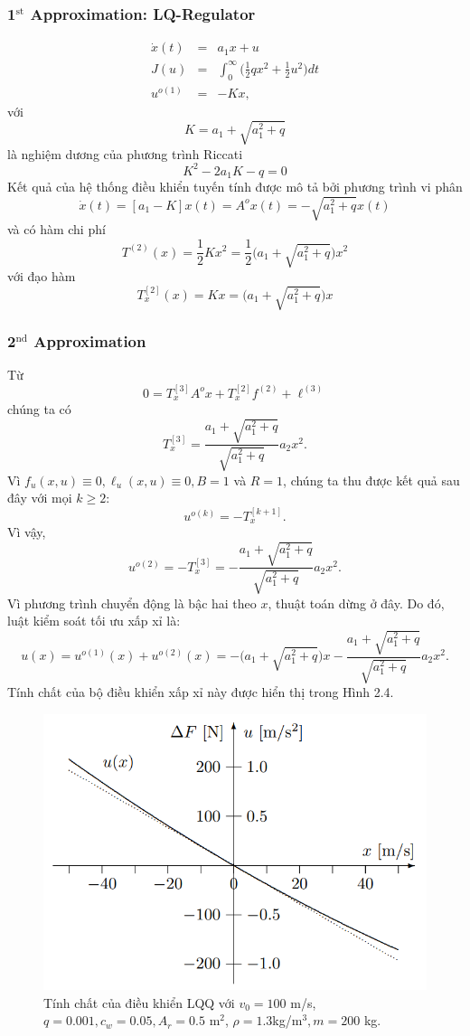 \documentclass[12pt,a4paper]{report}
\begin{document}
\subsubsection{\textbf{1}$^\text{st}$ Approximation: LQ-Regulator} \begin{eqnarray}
	\dot{x}(t) &=&a_1x + u \nonumber \\ J(u) &=& \int_{0}^{\infty}\Big(\frac{1}{2}qx^2+\frac{1}{2}u^2\Big)dt \nonumber \\ u^{o(1)}&=&-Kx, \nonumber
\end{eqnarray} với $$K = a_1 + \sqrt{a_1^2+q}$$ là nghiệm dương của phương trình Riccati $$K^2-2a_1K-q=0$$ Kết quả của hệ thống điều khiển tuyến tính được mô tả bởi phương trình vi phân $$\dot{x}(t) = [a_1 - K]x(t) = A^ox(t) = -\sqrt{a_1^2+q}x(t)$$ và có hàm chi phí $$T^{(2)}(x) = \frac{1}{2}Kx^2 = \frac{1}{2}\bigg(a_1 + \sqrt{a_1^2+q}\bigg)x^2$$ với đạo hàm $$T_x^{[2]}(x) = Kx = \bigg(a_1 + \sqrt{a_1^2 + q}\bigg)x$$
\subsubsection{\textbf{2}$^\text{nd}$ Approximation}
Từ $$0 = T_x^{[3]}A^ox + T_x^{[2]}f^{(2)} + \ell^{(3)}$$ chúng ta có $$T_x^{[3]} = \frac{a_1 + \sqrt{a_1^2 + q}}{\sqrt{a_1^2 + q}}a_2x^2.$$ Vì $f_u(x, u) \equiv 0, \ell_u(x,u) \equiv 0, B=1$ và $R=1$, chúng ta thu được kết quả sau đây với mọi $k \geq 2$: $$u^{o(k)} = -T_x^{[k+1]}.$$ Vì vậy, $$u^{o(2)} = -T_x^{[3]} = -\frac{a_1+\sqrt{a_1^2+q}}{\sqrt{a_1^2+q}}a_2x^2.$$ Vì phương trình chuyển động là bậc hai theo $x$, thuật toán dừng ở đây. Do đó, luật kiểm soát tối ưu xấp xỉ là: $$u(x) = u^{o(1)}(x) + u^{o(2)}(x) = -\Big(a_1 + \sqrt{a_1^2+q} \Big)x - \frac{a_1 + \sqrt{a_1^2+q}}{\sqrt{a_1^2+q}}a_2x^2.$$ Tính chất của bộ điều khiển xấp xỉ này được hiển thị trong Hình 2.4.
\begin{figure}[h]
	\centering
	\includegraphics[scale=.6]{hinh6ct.png}
	\caption{Tính chất của điều khiển LQQ với $v_0 = 100$ m/s, $q = 0.001, c_w = 0.05, A_r = 0.5$ m$^2$, $\rho=1.3$kg/m$^3, m = 200$ kg.}
\end{figure}
\end{document}
